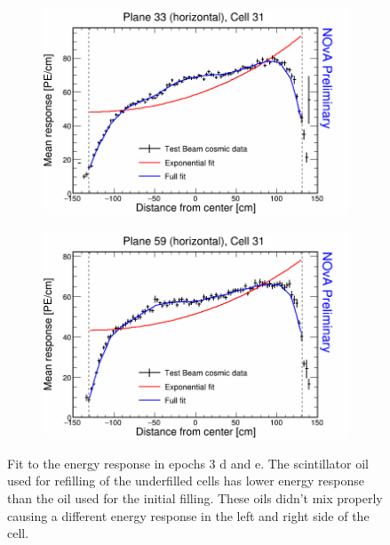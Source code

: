 \begin{figure}[h]
  \begin{subfigure}{0.5\textwidth}
    \includegraphics[width=\linewidth]{RelativeCalibrationResults/ep3de_033_031.png}
  \end{subfigure}
  \begin{subfigure}{0.5\textwidth}
    \includegraphics[width=\linewidth]{RelativeCalibrationResults/ep3de_059_031.png}
  \end{subfigure}
  \caption{Fit to the energy response in epochs 3 d and e. The scintillator oil used for refilling of the underfilled cells has lower energy response than the oil used for the initial filling. These oils didn't mix properly causing a different energy response in the left and right side of the cell.}
  \label{fig:AttenfitResultsEpoch3de_RefilledDiscrepancy}
\end{figure}

